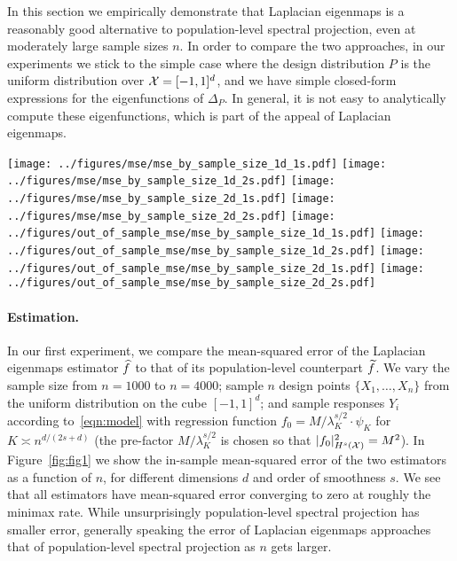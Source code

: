 In this section we empirically demonstrate that Laplacian eigenmaps is a reasonably good alternative to population-level spectral projection, even at moderately large sample sizes $n$. In order to compare the two approaches, in our experiments we stick to the simple case where the design distribution $P$ is the uniform distribution over $\mathcal{X} = [-1,1]^d$, and we have simple closed-form expressions for the eigenfunctions of $\Delta_P$. In general, it is not easy to analytically compute these eigenfunctions, which is part of the appeal of Laplacian eigenmaps.

\begin{figure*}[tb]
	\texttt{[image: ../figures/mse/mse\_by\_sample\_size\_1d\_1s.pdf]}
	\texttt{[image: ../figures/mse/mse\_by\_sample\_size\_1d\_2s.pdf]}
	\texttt{[image: ../figures/mse/mse\_by\_sample\_size\_2d\_1s.pdf]}
	\texttt{[image: ../figures/mse/mse\_by\_sample\_size\_2d\_2s.pdf]}
	\texttt{[image: ../figures/out\_of\_sample\_mse/mse\_by\_sample\_size\_1d\_1s.pdf]}
	\texttt{[image: ../figures/out\_of\_sample\_mse/mse\_by\_sample\_size\_1d\_2s.pdf]}
	\texttt{[image: ../figures/out\_of\_sample\_mse/mse\_by\_sample\_size\_2d\_1s.pdf]}
	\texttt{[image: ../figures/out\_of\_sample\_mse/mse\_by\_sample\_size\_2d\_2s.pdf]}
	\caption{Mean squared error (mse) of Laplacian eigenmaps and spectral projection estimators. Top row: in-sample mse of Laplacian eigenmaps (\texttt{LE}) and a spectral projection estimator (\texttt{SP}) as a function of sample size $n$. Bottom row: out-of-sample mse of Laplacian eigenmaps plus kernel smoothing (\texttt{LE+KS}) and a spectral projection estimator. Each plot is on the log-log scale, and the results are averaged over 400 repetitions. All estimators are tuned for optimal average mse. The black line shows the minimax rate (in slope only; the intercept is chosen to match the observed error).}
	\label{fig:fig1}
\end{figure*}

\paragraph{Estimation.}
In our first experiment, we compare the mean-squared error of the Laplacian eigenmaps estimator $\widehat{f}$  to that of its population-level counterpart $\widetilde{f}$. We vary the sample size from $n = 1000$ to $n = 4000$; sample $n$ design points $\{X_1,\ldots,X_n\}$ from the uniform distribution on the cube $[-1,1]^d$; and sample responses $Y_i$ according to~\eqref{eqn:model} with regression function $f_0 = M/\lambda_K^{s/2} \cdot \psi_K$ for $K \asymp n^{d/(2s + d)}$ (the pre-factor $M/\lambda_K^{s/2}$ is chosen so that $|f_0|_{H^s(\mathcal{X})}^2 = M^2$). In Figure~\ref{fig:fig1} we show the in-sample mean-squared error of the two estimators as a function of $n$, for different dimensions $d$ and order of smoothness $s$. We see that all estimators have mean-squared error converging to zero at roughly the minimax rate. While unsurprisingly population-level spectral projection has smaller error, generally speaking the error of Laplacian eigenmaps approaches that of population-level spectral projection as $n$ gets larger. 

